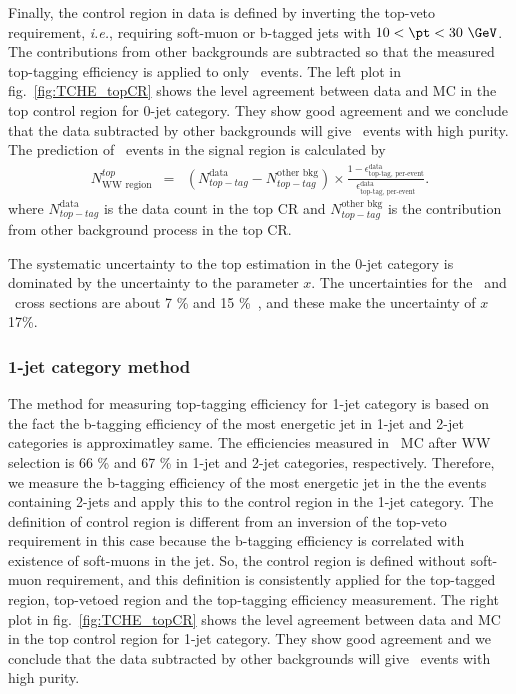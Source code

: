 Finally, the control region in data is defined by inverting the top-veto requirement, 
\textit{i.e.}, requiring soft-muon or b-tagged jets with $10<\pt<30~\GeV$.
The contributions from other backgrounds are subtracted so that the 
measured top-tagging efficiency is applied to only \topbkg\ events. 
The left plot in fig.~\ref{fig:TCHE_topCR} shows the level agreement between 
data and MC in the top control region for 0-jet category.  
They show good agreement and we conclude that the data subtracted by other backgrounds 
will give \topbkg\ events with high purity. 
The prediction of \topbkg\ events in the signal region is calculated by 
\begin{eqnarray} 
\label{eq:topExtrapolation0jet}
N^{top}_{\textrm{WW region}}
&=&   
(N_{top-tag}^{\textrm{data}}-N_{top-tag}^{\textrm{other bkg}}) \times
\frac{1-\epsilon_{\textrm{top-tag, per-event}}^{\textrm{data}}}
     {\epsilon_{\textrm{top-tag, per-event}}^{\textrm{data}}}.  
\end{eqnarray} 
where $N_{top-tag}^{\textrm{data}}$ is the data count in the top CR 
and $N_{top-tag}^{\textrm{other bkg}}$ is the contribution from other 
background process in the top CR.

The systematic uncertainty to the top estimation in the 0-jet category 
is dominated by the uncertainty to the parameter $x$. The uncertainties
for the \ttbar\ and \tw\ cross sections are about 7 \% and 15 \%~\cite{Kidonakis:2012rm}, 
and these make the uncertainty of $x$ 17\%. 

\subsubsection{1-jet category method}

The method for measuring top-tagging efficiency for 1-jet category is 
based on the fact the b-tagging efficiency of the most energetic jet 
in 1-jet and 2-jet categories is approximatley same. The efficiencies 
measured in \ttbar\ MC after WW selection is 66 \% and 67 \% in 1-jet 
and 2-jet categories, respectively. Therefore, we measure the b-tagging 
efficiency of the most energetic jet in the the events containing 2-jets
and apply this to the control region in the 1-jet category.  
The definition of control region is different from an inversion of 
the top-veto requirement in this case because the b-tagging efficiency 
is correlated with existence of soft-muons in the jet. 
So, the control region is defined without soft-muon requirement, 
and this definition is consistently applied for the top-tagged region, 
top-vetoed region and the top-tagging efficiency measurement.
The right plot in fig.~\ref{fig:TCHE_topCR} shows the level agreement between 
data and MC in the top control region for 1-jet category.  
They show good agreement and we conclude that the data subtracted by other backgrounds 
will give \topbkg\ events with high purity. 

